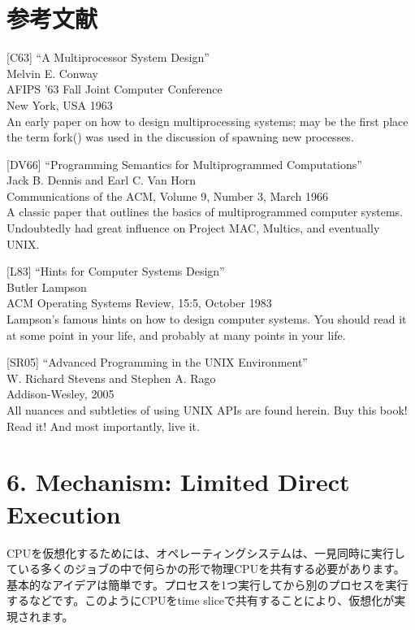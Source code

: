 \hypertarget{ux53c2ux8003ux6587ux732e-1}{%
\section*{参考文献}\label{ux53c2ux8003ux6587ux732e-1}}

{[}C63{]} ``A Multiprocessor System Design''\\
Melvin E. Conway\\
AFIPS '63 Fall Joint Computer Conference\\
New York, USA 1963\\
An early paper on how to design multiprocessing systems; may be the
first place the term fork() was used in the discussion of spawning new
processes.

{[}DV66{]} ``Programming Semantics for Multiprogrammed Computations''\\
Jack B. Dennis and Earl C. Van Horn\\
Communications of the ACM, Volume 9, Number 3, March 1966\\
A classic paper that outlines the basics of multiprogrammed computer
systems. Undoubtedly had great influence on Project MAC, Multics, and
eventually UNIX.

{[}L83{]} ``Hints for Computer Systems Design''\\
Butler Lampson\\
ACM Operating Systems Review, 15:5, October 1983\\
Lampson's famous hints on how to design computer systems. You should
read it at some point in your life, and probably at many points in your
life.

{[}SR05{]} ``Advanced Programming in the UNIX Environment''\\
W. Richard Stevens and Stephen A. Rago\\
Addison-Wesley, 2005\\
All nuances and subtleties of using UNIX APIs are found herein. Buy this
book! Read it! And most importantly, live it.

\hypertarget{mechanism-limited-direct-execution}{%
\section*{6. Mechanism: Limited Direct
Execution}\label{mechanism-limited-direct-execution}}

CPUを仮想化するためには、オペレーティングシステムは、一見同時に実行している多くのジョブの中で何らかの形で物理CPUを共有する必要があります。基本的なアイデアは簡単です。プロセスを1つ実行してから別のプロセスを実行するなどです。このようにCPUをtime
sliceで共有することにより、仮想化が実現されます。

